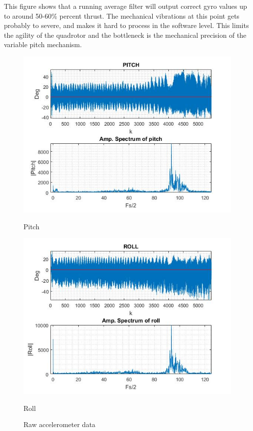 This figure shows that a running average filter will output correct gyro values up to around 50-60\% percent thrust. The mechanical vibrations at this point gets probably to severe, and makes it hard to process in the software level. This limits the agility of the quadrotor and the bottleneck is the mechanical precision of the variable pitch mechanism.
\begin{figure}[H]
        \centering
            \begin{minipage}[b]{0.49\textwidth}
                \includegraphics[width = \textwidth, angle= 0]{NoisePictures/PITCHacc.jpg}
                \caption{Pitch}
            \end{minipage}
            \hfill
            \begin{minipage}[b]{0.49\textwidth}
                \includegraphics[width =\textwidth, angle =0]{NoisePictures/ROLLacc.jpg}
                \caption{Roll}
            \end{minipage}
\label{fig:rawDataAcc}
\caption{Raw accelerometer data}
\end{figure}
